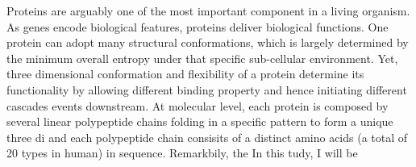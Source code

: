 Proteins are arguably one of the most important component in a living organism. As genes encode biological features, proteins deliver biological functions. One protein can adopt many structural conformations, which is largely determined by the minimum overall entropy under that specific sub-cellular environment. Yet, three dimensional conformation and flexibility of a protein determine its functionality by allowing different binding property and hence initiating different cascades events downstream. At molecular level, each protein is composed by several linear polypeptide chains folding in a specific pattern to form a unique three di and each polypeptide chain consisits of a distinct amino acids (a total of 20 types in human) in sequence. Remarkbily, the  In this tudy, I will be 